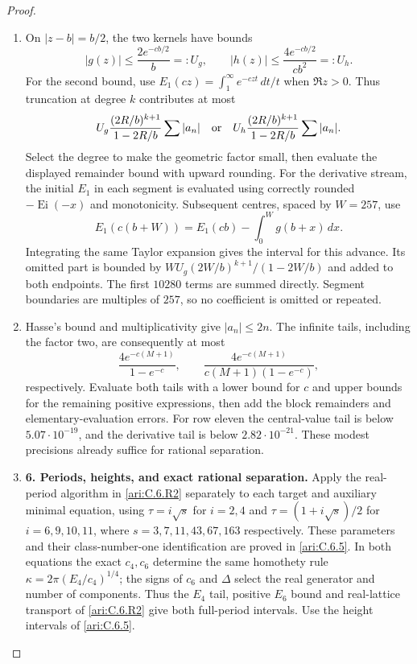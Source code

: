\begin{proof}
\begin{enumerate}[label=\arabic*.,leftmargin=*]
\item On $|z-b|=b/2$, the two kernels have bounds
\[
 |g(z)|\leq\frac{2e^{-cb/2}}b=:U_g,
 \qquad
 |h(z)|\leq\frac{4e^{-cb/2}}{cb^2}=:U_h.
\]
For the second bound, use
$E_1(cz)=\int_1^\infty e^{-czt}\,dt/t$ when $\Re z>0$.
Thus truncation at degree $k$ contributes at most
\[
 U_g\frac{(2R/b)^{k+1}}{1-2R/b}\sum|a_n|
 \quad\hbox{or}\quad
 U_h\frac{(2R/b)^{k+1}}{1-2R/b}\sum|a_n|.
\]
Select the degree to make the geometric factor small, then evaluate
the displayed remainder bound with upward rounding.
For the derivative stream, the initial $E_1$ in each segment is
evaluated using correctly rounded $-\operatorname{Ei}(-x)$ and
monotonicity. Subsequent centres, spaced by $W=257$, use
\[
 E_1(c(b+W))=E_1(cb)-\int_0^Wg(b+x)\,dx.
\]
Integrating the same Taylor expansion gives the interval for this
advance. Its omitted part is bounded by
$WU_g(2W/b)^{k+1}/(1-2W/b)$ and added to both endpoints.
The first $10280$ terms are summed directly. Segment boundaries
are multiples of $257$, so no coefficient is omitted or repeated.

\item Hasse's bound and multiplicativity give $|a_n|\leq2n$.
The infinite tails, including the factor two, are consequently at
most
\[
 \frac{4e^{-c(M+1)}}{1-e^{-c}},\qquad
 \frac{4e^{-c(M+1)}}{c(M+1)(1-e^{-c})},
\]
respectively. Evaluate both tails with a lower bound for $c$ and upper bounds
for the remaining positive expressions, then add the block
remainders and elementary-evaluation errors. For row eleven the central-value tail is below
$5.07\cdot10^{-19}$, and the derivative tail is below
$2.82\cdot10^{-21}$. These modest precisions already suffice for
rational separation. 

\item \textbf{6. Periods, heights, and exact rational separation.}
Apply the real-period algorithm in \cref{ari:C.6.R2} separately
to each target and auxiliary minimal equation, using
$\tau=i\sqrt s$ for $i=2,4$ and
$\tau=(1+i\sqrt s)/2$ for $i=6,9,10,11$, where
$s=3,7,11,43,67,163$ respectively.
These parameters and their class-number-one identification are
proved in \cref{ari:C.6.5}. In both equations the exact
$c_4,c_6$ determine the same homothety rule
$\kappa=2\pi(E_4/c_4)^{1/4}$; the signs of $c_6$ and $\Delta$
select the real generator and number of components.
Thus the $E_4$ tail, positive $E_6$ bound and real-lattice
transport of \cref{ari:C.6.R2} give both full-period intervals.
Use the height intervals of \cref{ari:C.6.5}.


\end{enumerate}
\end{proof}
